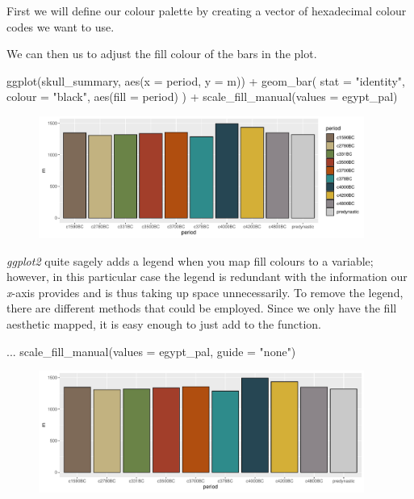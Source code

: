 First we will define our colour palette by creating a vector of hexadecimal colour codes we want to use.


\vspace{1em}

\noindent
We can then us  to adjust the fill colour of the bars in the plot.

\begin{inR}
ggplot(skull_summary, aes(x = period, y = m)) +
  geom_bar(
    stat = "identity",
    colour = "black",
    aes(fill = period)
  ) +
  scale_fill_manual(values = egypt_pal)
\end{inR}

\vspace{2em}

\begin{figure}[H]
\includegraphics[width = 0.95\textwidth]{graphics/ch3Figs/bar_2.pdf}
\end{figure}

\noindent
\textit{ggplot2} quite sagely adds a legend when you map fill colours to a variable; however, in this particular case the legend is redundant with the information our \textit{x}-axis provides and is thus taking up space unnecessarily. To remove the legend, there are different methods that could be employed. Since we only have the fill aesthetic mapped, it is easy enough to just add  to the  function.

\begin{inR}
...
  scale_fill_manual(values = egypt_pal, guide = "none")
\end{inR}

\vspace{2em}

\begin{figure}[H]
\includegraphics[width = 0.95\textwidth]{graphics/ch3Figs/bar_3.pdf}
\end{figure}

